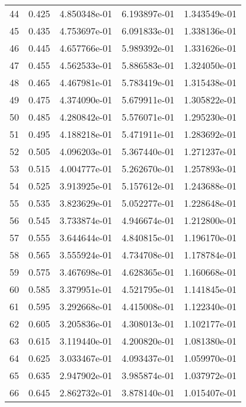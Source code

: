 \begin{table}[ht]
\begin{tabular}{rcccc}
    44 &  0.425 &    4.850348e-01 &    6.193897e-01  &     1.343549e-01\\ 
    45 &  0.435 &    4.753697e-01 &    6.091833e-01  &     1.338136e-01\\ 
    46 &  0.445 &    4.657766e-01 &    5.989392e-01  &     1.331626e-01\\ 
    47 &  0.455 &    4.562533e-01 &    5.886583e-01  &     1.324050e-01\\ 
    48 &  0.465 &    4.467981e-01 &    5.783419e-01  &     1.315438e-01\\ 
    49 &  0.475 &    4.374090e-01 &    5.679911e-01  &     1.305822e-01\\ 
    50 &  0.485 &    4.280842e-01 &    5.576071e-01  &     1.295230e-01\\ 
    51 &  0.495 &    4.188218e-01 &    5.471911e-01  &     1.283692e-01\\ 
    52 &  0.505 &    4.096203e-01 &    5.367440e-01  &     1.271237e-01\\ 
    53 &  0.515 &    4.004777e-01 &    5.262670e-01  &     1.257893e-01\\ 
    54 &  0.525 &    3.913925e-01 &    5.157612e-01  &     1.243688e-01\\ 
    55 &  0.535 &    3.823629e-01 &    5.052277e-01  &     1.228648e-01\\ 
    56 &  0.545 &    3.733874e-01 &    4.946674e-01  &     1.212800e-01\\ 
    57 &  0.555 &    3.644644e-01 &    4.840815e-01  &     1.196170e-01\\ 
    58 &  0.565 &    3.555924e-01 &    4.734708e-01  &     1.178784e-01\\ 
    59 &  0.575 &    3.467698e-01 &    4.628365e-01  &     1.160668e-01\\ 
    60 &  0.585 &    3.379951e-01 &    4.521795e-01  &     1.141845e-01\\ 
    61 &  0.595 &    3.292668e-01 &    4.415008e-01  &     1.122340e-01\\ 
    62 &  0.605 &    3.205836e-01 &    4.308013e-01  &     1.102177e-01\\ 
    63 &  0.615 &    3.119440e-01 &    4.200820e-01  &     1.081380e-01\\ 
    64 &  0.625 &    3.033467e-01 &    4.093437e-01  &     1.059970e-01\\ 
    65 &  0.635 &    2.947902e-01 &    3.985874e-01  &     1.037972e-01\\ 
    66 &  0.645 &    2.862732e-01 &    3.878140e-01  &     1.015407e-01\\ 

\end{tabular}
\end{table}
